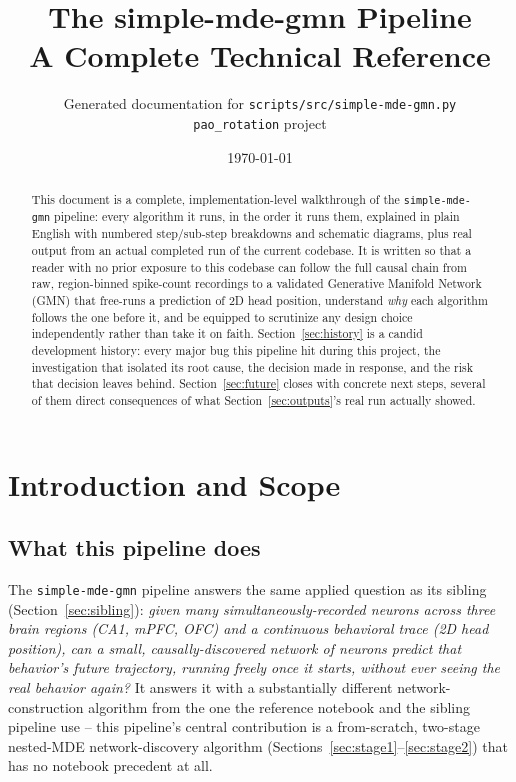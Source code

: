 \documentclass[11pt]{article}
\title{\textbf{The simple-mde-gmn Pipeline}\\[4pt]\Large A Complete Technical Reference}
\author{Generated documentation for \texttt{scripts/src/simple-mde-gmn.py}\\\texttt{pao\_rotation} project}
\date{\today}
\begin{document}
\maketitle
\thispagestyle{empty}

\begin{abstract}
\noindent This document is a complete, implementation-level walkthrough of the \texttt{simple-mde-gmn} pipeline: every algorithm it runs, in the order it runs them, explained in plain English with numbered step/sub-step breakdowns and schematic diagrams, plus real output from an actual completed run of the current codebase. It is written so that a reader with no prior exposure to this codebase can follow the full causal chain from raw, region-binned spike-count recordings to a validated Generative Manifold Network (GMN) that free-runs a prediction of 2D head position, understand \emph{why} each algorithm follows the one before it, and be equipped to scrutinize any design choice independently rather than take it on faith. Section~\ref{sec:history} is a candid development history: every major bug this pipeline hit during this project, the investigation that isolated its root cause, the decision made in response, and the risk that decision leaves behind. Section~\ref{sec:future} closes with concrete next steps, several of them direct consequences of what Section~\ref{sec:outputs}'s real run actually showed.
\end{abstract}

\tableofcontents
\newpage

\section{Introduction and Scope}

\subsection{What this pipeline does}
The \texttt{simple-mde-gmn} pipeline answers the same applied question as its sibling (Section~\ref{sec:sibling}): \emph{given many simultaneously-recorded neurons across three brain regions (CA1, mPFC, OFC) and a continuous behavioral trace (2D head position), can a small, causally-discovered network of neurons predict that behavior's future trajectory, running freely once it starts, without ever seeing the real behavior again?} It answers it with a substantially different network-construction algorithm from the one the reference notebook and the sibling pipeline use -- this pipeline's central contribution is a from-scratch, two-stage nested-MDE network-discovery algorithm (Sections~\ref{sec:stage1}--\ref{sec:stage2}) that has no notebook precedent at all.
\end{document}
